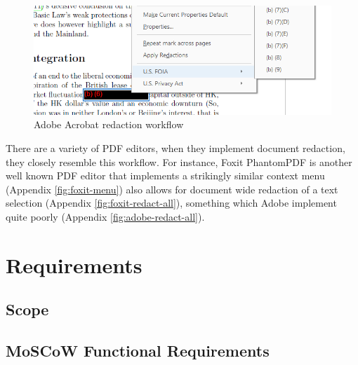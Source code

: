 \documentclass{l4proj}
\begin{document}
\begin{figure}
    \includegraphics[width=\linewidth]{images/adobe_redaction.png}
    \caption{Adobe Acrobat redaction workflow}
    \label{fig:adobe-redaction}
\end{figure}

There are a variety of PDF editors, when they implement document redaction, they closely resemble this workflow.
For instance, Foxit PhantomPDF is another well known PDF editor that implements a strikingly similar context menu (Appendix \ref{fig:foxit-menu}) also allows for document wide redaction of a text selection (Appendix \ref{fig:foxit-redact-all}), something which Adobe implement quite poorly (Appendix \ref{fig:adobe-redact-all}).

\chapter{Requirements}

\section{Scope}

\section{MoSCoW Functional Requirements}
\end{document}
